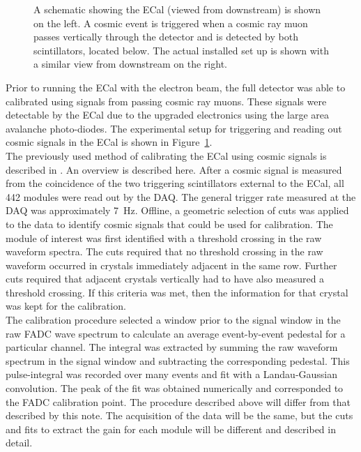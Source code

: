 \documentclass[twoside]{article}
\begin{document}
\begin{figure}[hbt]
\begin{minipage}{0.45\textwidth}
 \end{minipage}
 \caption[Setup for the cosmic trigger]{A schematic showing the ECal (viewed from downstream) is shown on the left. A cosmic event is triggered when a cosmic ray muon passes vertically through the detector and is detected by both scintillators, located below. The actual installed set up is shown with a similar view from downstream on the right.}
  \label{fig:cosmicSetup}
\end{figure}
Prior to running the ECal with the electron beam, the full detector was able to calibrated using signals from passing cosmic ray muons. These signals were detectable by the ECal due to the upgraded electronics using the large area avalanche photo-diodes. The experimental setup for triggering and reading out cosmic signals in the ECal is shown in Figure~\ref{fig:cosmicSetup}.\\
\indent The previously used method of calibrating the ECal using cosmic signals is described in \cite{szumila-vance_hps_2016}. An overview is described here. After a cosmic signal is measured from the coincidence of the two triggering scintillators external to the ECal, all 442 modules were read out by the DAQ. The general trigger rate measured at the DAQ was approximately 7~Hz. Offline, a geometric selection of cuts was applied to the data to identify cosmic signals that could be used for calibration. The module of interest was first identified with a threshold crossing in the raw waveform spectra. The cuts required that no threshold crossing in the raw waveform occurred in crystals immediately adjacent in the same row. Further cuts required that adjacent crystals vertically had to have also measured a threshold crossing. If this criteria was met, then the information for that crystal was kept for the calibration.\\
\indent The calibration procedure selected a window prior to the signal window in the raw FADC wave spectrum to calculate an average event-by-event pedestal for a particular channel. The integral was extracted by summing the raw waveform spectrum in the signal window and subtracting the corresponding pedestal. This pulse-integral was recorded over many events and fit with a Landau-Gaussian convolution. The peak of the fit was obtained numerically and corresponded to the FADC calibration point. The procedure described above will differ from that described by this note. The acquisition of the data will be the same, but the cuts and fits to extract the gain for each module will be different and described in detail. 
\end{document}
